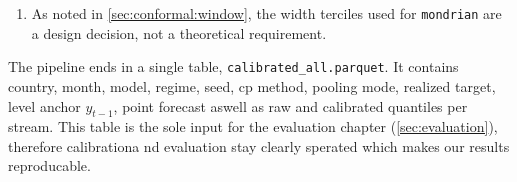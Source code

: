 \begin{enumerate}
%
%

  \item As noted in \cref{sec:conformal:window}, the width terciles used for
  \texttt{mondrian} are a design decision, not a theoretical requirement.
\end{enumerate}


The pipeline ends in a single table, \texttt{calibrated\_all.parquet}. It contains country, month, model, regime, seed, cp method, pooling mode, realized target, level anchor $y_{t-1}$, point forecast aswell as raw and calibrated quantiles per stream. This table is the sole input for the evaluation chapter (\cref{sec:evaluation}), therefore calibrationa nd evaluation stay clearly sperated which makes our results reproducable.
